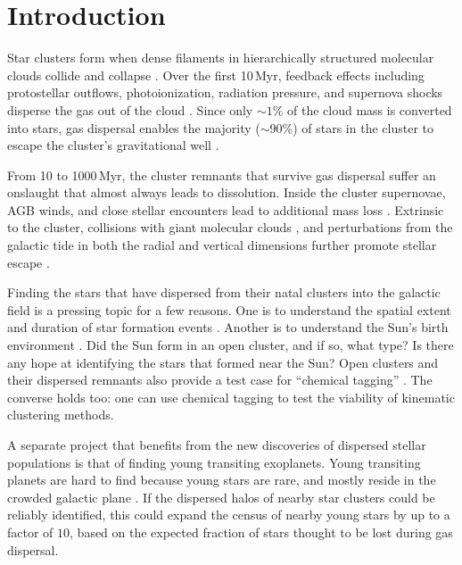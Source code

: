 \documentclass[12pt,twocolumn,tighten]{aastex63}
\begin{document}


\section{Introduction}

Star clusters form when dense filaments in hierarchically structured
molecular clouds collide and collapse \citep{shu_star_1987}.  Over the
first 10\,Myr, feedback effects including protostellar outflows,
photoionization, radiation pressure, and supernova shocks disperse the
gas out of the cloud \citep{krumholz_star_2019}.  Since only $\sim
1\%$ of the cloud mass is converted into stars, gas dispersal enables
the majority ($\sim$90\%) of stars in the cluster to escape the
cluster's gravitational well \citep{lada_embedded_2003}.

From 10 to 1000\,Myr, the cluster remnants that survive gas dispersal
suffer an onslaught that almost always leads to dissolution.  Inside
the cluster supernovae, AGB winds, and close stellar encounters lead
to additional mass loss \citep{lamers_mass_loss_2010}.  Extrinsic to
the cluster, collisions with giant molecular clouds
\citep{spitzer_disruption_1958}, and perturbations from the galactic
tide in both the radial and vertical dimensions further promote
stellar escape \citep[{\it
e.g.},][]{fukushige_timescale_2000,bergond_gravitational_2001}.

Finding the stars that have dispersed from their natal clusters into
the galactic field is a pressing topic for a few reasons.  One is to
understand the spatial extent and duration of star formation events
\citep[{\it e.g.},][]{wright_kinematics_2018}.  Another
is to understand the Sun's birth environment \citep{adams_birth_2010}.
Did the Sun form in an open cluster, and if so, what type? Is there
any hope at identifying the stars that formed near the Sun?  Open
clusters and their dispersed remnants also provide a test case for
``chemical tagging'' \citep[{\it
e.g.},][]{freeman_new_2002,hogg_chemical_2016,ness_dopplergangers_2018}.
The converse holds too: one can use chemical tagging to test the
viability of kinematic clustering methods.

A separate project that benefits from the new discoveries of dispersed
stellar populations is that of finding young transiting exoplanets.
Young transiting planets are hard to find because young stars are
rare, and mostly reside in the crowded galactic plane \citep[see {\it
e.g.},][]{Kharchenko_et_al_2013,piskunov_global_2018}.  If the
dispersed halos of nearby star clusters could be reliably identified,
this could expand the census of nearby young stars by up to a factor
of $10$, based on the expected fraction of stars thought to be lost
during gas dispersal.
\end{document}
